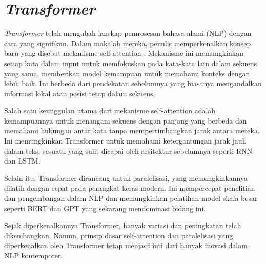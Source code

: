 \section{\textit{Transformer}}

\textit{Transformer} telah mengubah lanskap pemrosesan bahasa alami (NLP) dengan cara yang signifikan. Dalam makalah mereka, penulis memperkenalkan konsep baru yang disebut mekanisme self-attention \parencite{transformers}. Mekanisme ini memungkinkan setiap kata dalam input untuk memfokuskan pada kata-kata lain dalam sekuens yang sama, memberikan model kemampuan untuk memahami konteks dengan lebih baik. Ini berbeda dari pendekatan sebelumnya yang biasanya mengandalkan informasi lokal atau posisi tetap dalam sekuens.

Salah satu keunggulan utama dari mekanisme self-attention adalah kemampuannya untuk menangani sekuens dengan panjang yang berbeda dan memahami hubungan antar kata tanpa mempertimbangkan jarak antara mereka. Ini memungkinkan Transformer untuk memahami ketergantungan jarak jauh dalam teks, sesuatu yang sulit dicapai oleh arsitektur sebelumnya seperti RNN dan LSTM.

Selain itu, Transformer dirancang untuk paralelisasi, yang memungkinkannya dilatih dengan cepat pada perangkat keras modern. Ini mempercepat penelitian dan pengembangan dalam NLP dan memungkinkan pelatihan model skala besar seperti BERT dan GPT yang sekarang mendominasi bidang ini.

Sejak diperkenalkannya Transformer, banyak variasi dan peningkatan telah dikembangkan. Namun, prinsip dasar self-attention dan paralelisasi yang diperkenalkan oleh Transformer tetap menjadi inti dari banyak inovasi dalam NLP kontemporer.